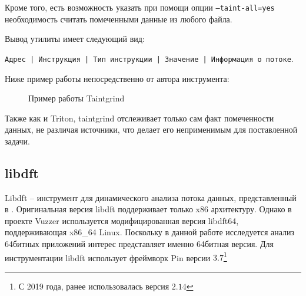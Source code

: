 \bigskip
Кроме того, есть возможность указать при помощи опции \texttt{--taint-all=yes} необходимость считать помеченными данные из любого файла.

Вывод утилиты имеет следующий вид:

\mbox{\texttt{Адрес | Инструкция | Тип инструкции | Значение | Информация о потоке}}.

Ниже пример работы непосредственно от автора инструмента:

\begin{figure}[H]
    \caption{Пример работы Taintgrind}
    \label{fig:taintgrind}
\end{figure}

Также как и Triton, taintgrind отслеживает только сам факт помеченности данных, не различая источники, что делает его неприменимым для поставленной задачи.

\subsection{libdft}

Libdft -- инструмент для динамического анализа потока данных, представленный в \cite{libdft}. Оригинальная версия libdft поддерживает только x86 архитектуру. Однако в проекте Vuzzer \cite{vuzzer} используется модифицированная версия libdft64, поддерживающая x86\_64 Linux. Поскольку в данной работе исследуется анализ 64битных приложений интерес представляет именно 64битная версия.
Для инструментации libdft использует фреймворк Pin версии $3.7$\footnote{С 2019 года, ранее использовалась версия $2.14$}


